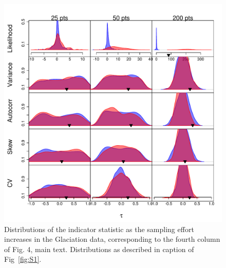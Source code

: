 \documentclass[11pt]{elsarticle}
\begin{document}
\begin{figure}[ht]
  \begin{center}
    \includegraphics{FigS5.pdf}
  \end{center}
  \caption{Distributions of the indicator statistic as the sampling effort increases in the Glaciation data, corresponding to the fourth column of Fig. 4, main text.  Distributions as described in caption of Fig~\ref{fig:S1}.}
  \label{fig:S5}
\end{figure}

\pagebreak

\section*{ }%
 

 
\end{document}
